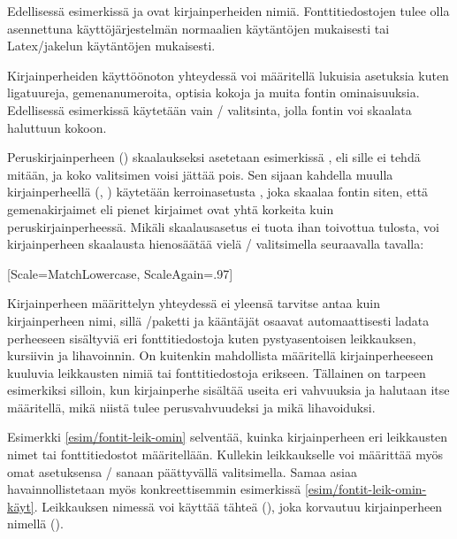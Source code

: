 \noindent
Edellisessä esimerkissä  ja
 ovat kirjainperheiden nimiä. Fonttitiedostojen
tulee olla asennettuna käyttöjärjestelmän normaalien käytäntöjen
mukaisesti tai Latex\-/jakelun käytäntöjen mukaisesti.

Kirjainperheiden käyttöönoton yhteydessä voi määritellä lukuisia
asetuksia kuten ligatuureja, gemenanumeroita, optisia kokoja ja muita
fontin ominaisuuksia. Edellisessä esimerkissä käytetään vain
\-/ valitsinta, jolla fontin voi skaalata haluttuun kokoon.

Peruskirjainperheen () skaalaukseksi asetetaan
esimerkissä , eli sille ei tehdä mitään, ja koko
valitsimen voisi jättää pois. Sen sijaan kahdella muulla
kirjainperheellä (, )
käytetään kerroinasetusta , joka skaalaa fontin
siten, että gemenakirjaimet eli pienet kirjaimet ovat yhtä korkeita kuin
peruskirjainperheessä. Mikäli skaalausasetus  ei
tuota ihan toivottua tulosta, voi kirjainperheen skaalausta hienosäätää
vielä \-/ valitsimella seuraavalla tavalla:

\begin{koodilohkosis}
\setmonofont{TeX Gyre Cursor}
[Scale=MatchLowercase, ScaleAgain=.97]
\end{koodilohkosis}

\noindent
Kirjainperheen määrittelyn yhteydessä ei yleensä tarvitse antaa kuin
kirjainperheen nimi, sillä \-/paketti ja kääntäjät
osaavat automaattisesti ladata perheeseen sisältyviä eri
fonttitiedostoja kuten pystyasentoisen leikkauksen, kursiivin ja
lihavoinnin. On kuitenkin mahdollista määritellä kirjainperheeseen
kuuluvia leikkausten nimiä tai fonttitiedostoja erikseen. Tällainen on
tarpeen esimerkiksi silloin, kun kirjainperhe sisältää useita eri
vahvuuksia ja halutaan itse määritellä, mikä niistä tulee
perusvahvuudeksi ja mikä lihavoiduksi.

Esimerkki \ref{esim/fontit-leik-omin} selventää, kuinka kirjainperheen
eri leikkausten nimet tai fonttitiedostot määritellään. Kullekin
leikkaukselle voi määrittää myös omat asetuksensa \-/
sanaan päättyvällä valitsimella. Samaa asiaa havainnollistetaan myös
konkreettisemmin esimerkissä \ref{esim/fontit-leik-omin-käyt}.
Leikkauksen nimessä voi käyttää tähteä (\koodi{*}), joka korvautuu
kirjainperheen nimellä ().

